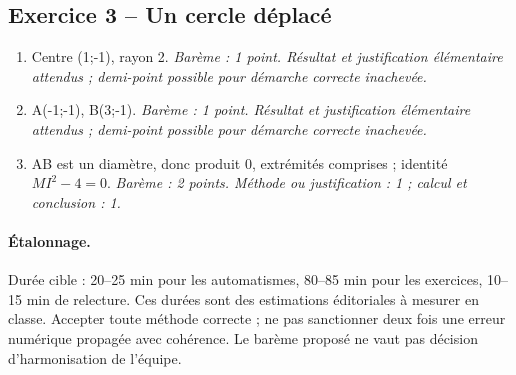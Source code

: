 \subsection*{Exercice 3 -- Un cercle déplacé}
\begin{enumerate}
\item Centre (1;-1), rayon 2. \textit{Barème : 1 point. Résultat et justification élémentaire attendus ; demi-point possible pour démarche correcte inachevée.}
\item A(-1;-1), B(3;-1). \textit{Barème : 1 point. Résultat et justification élémentaire attendus ; demi-point possible pour démarche correcte inachevée.}
\item AB est un diamètre, donc produit 0, extrémités comprises ; identité $MI^2-4=0$. \textit{Barème : 2 points. Méthode ou justification : 1 ; calcul et conclusion : 1.}
\end{enumerate}
\paragraph{Étalonnage.} Durée cible : 20–25 min pour les automatismes, 80–85 min pour les exercices, 10–15 min de relecture. Ces durées sont des estimations éditoriales à mesurer en classe. Accepter toute méthode correcte ; ne pas sanctionner deux fois une erreur numérique propagée avec cohérence. Le barème proposé ne vaut pas décision d’harmonisation de l’équipe.
